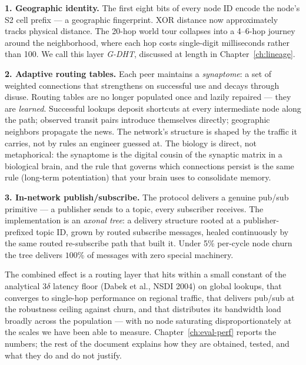 \documentclass[twoside,nobib]{tufte-book}
\newcommand{\GDHT}{G-DHT\xspace}
\begin{document}
\textbf{1. Geographic identity.} The first eight bits of every node
ID encode the node's S2 cell prefix --- a geographic
fingerprint. XOR distance now approximately tracks physical
distance. The 20-hop world tour collapses into a 4--6-hop journey
around the neighborhood, where each hop costs single-digit
milliseconds rather than 100. We call this layer \emph{\GDHT},
discussed at length in Chapter~\ref{ch:lineage}.

\textbf{2. Adaptive routing tables.} Each peer maintains a
\emph{synaptome}: a set of weighted connections that strengthens on
successful use and decays through disuse. Routing tables are no
longer populated once and lazily repaired --- they are
\emph{learned}. Successful lookups deposit shortcuts at every
intermediate node along the path; observed transit pairs introduce
themselves directly; geographic neighbors propagate the news. The
network's structure is shaped by the traffic it carries, not by
rules an engineer guessed at. The biology is direct, not
metaphorical: the synaptome is the digital cousin of the synaptic
matrix in a biological brain, and the rule that governs which
connections persist is the same rule (long-term potentiation) that
your brain uses to consolidate memory.

\textbf{3. In-network publish/subscribe.} The protocol delivers a
genuine pub/sub primitive --- a publisher sends to a topic, every
subscriber receives. The implementation is an \emph{axonal tree}: a
delivery structure rooted at a publisher-prefixed topic ID, grown by
routed subscribe messages, healed continuously by the same routed
re-subscribe path that built it. Under 5\% per-cycle node churn the
tree delivers $100\%$ of messages with zero special machinery.

The combined effect is a routing layer that hits within a small
constant of the analytical $3\delta$ latency floor (Dabek et al.,
NSDI 2004) on global lookups, that converges to single-hop
performance on regional traffic, that delivers pub/sub at the
robustness ceiling against churn, and that distributes its
bandwidth load broadly across the population --- with no node
saturating disproportionately at the scales we have been able to
measure. Chapter~\ref{ch:eval-perf} reports the numbers; the rest of
the document explains how they are obtained, tested, and what they
do and do not justify.
\end{document}

